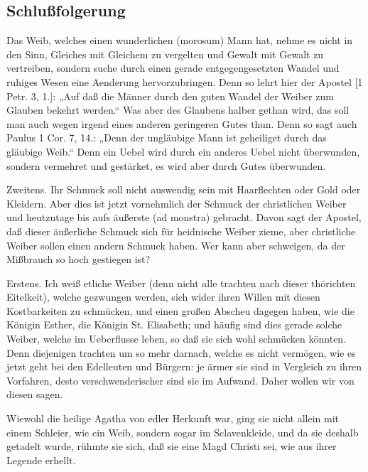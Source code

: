 \subsection{Schlußfolgerung}

Das Weib, welches einen wunderlichen (morosum) Mann hat, nehme es nicht in den Sinn, Gleiches mit Gleichem zu vergelten und Gewalt mit Gewalt zu vertreiben, sondern suche durch einen gerade entgegengesetzten Wandel und ruhiges Wesen eine Aenderung hervorzubringen. Denn so lehrt hier der Apostel [1 Petr. 3, 1.]: „Auf daß die Männer durch den guten Wandel der Weiber zum Glauben bekehrt werden.“ Was aber des Glaubens halber gethan wird, das soll man auch wegen irgend eines anderen geringeren Gutes thun. Denn so sagt auch Paulus 1 Cor. 7, 14.: „Denn der ungläubige Mann ist geheiliget durch das gläubige Weib.“ Denn ein Uebel wird durch ein anderes Uebel nicht überwunden, sondern vermehret und gestärket, es wird aber durch Gutes überwunden.

Zweitens. Ihr Schmuck soll nicht auswendig sein mit Haarflechten oder Gold oder Kleidern. Aber dies ist jetzt vornehmlich der Schmuck der christlichen Weiber und heutzutage bis aufs äußerste (ad monstra) gebracht. Davon sagt der Apostel, daß dieser äußerliche Schmuck sich für heidnische Weiber zieme, aber christliche Weiber sollen einen andern Schmuck haben. Wer kann aber schweigen, da der Mißbrauch so hoch gestiegen ist?

Erstens. Ich weiß etliche Weiber (denn nicht alle trachten nach dieser thörichten Eitelkeit), welche gezwungen werden, sich wider ihren Willen mit diesen Kostbarkeiten zu schmücken, und einen großen Abscheu dagegen haben, wie die Königin Esther, die Königin St. Elisabeth; und häufig sind dies gerade solche Weiber, welche im Ueberflusse leben, so daß sie sich wohl schmücken könnten. Denn diejenigen trachten um so mehr darnach, welche es nicht vermögen, wie es jetzt geht bei den Edelleuten und Bürgern: je ärmer sie sind in Vergleich zu ihren Vorfahren, desto verschwenderischer sind sie im Aufwand. Daher wollen wir von diesen sagen.

Wiewohl die heilige Agatha von edler Herkunft war, ging sie nicht allein mit einem Schleier, wie ein Weib, sondern sogar im Sclavenkleide, und da sie deshalb getadelt wurde, rühmte sie sich, daß sie eine Magd Christi sei, wie aus ihrer Legende erhellt.

